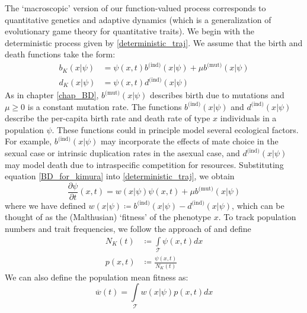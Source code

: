 The `macroscopic' version of our function-valued process corresponds to quantitative genetics and adaptive dynamics (which is a generalization of evolutionary game theory for quantitative traits). We begin with the deterministic process given by \eqref{deterministic_traj}. We assume that the birth and death functions take the form:
\begin{equation}
\label{BD_for_kimura}
\begin{aligned}
b_K(x|\psi) &=  \psi(x,t)b^{\textrm{(ind)}}(x|\psi) + \mu b^{\textrm{(mut)}}(x|\psi)\\
d_K(x|\psi) &= \psi(x,t)d^{\textrm{(ind)}}(x|\psi)
\end{aligned}
\end{equation}
As in chapter \ref{chap_BD}, $ b^{\textrm{(mut)}}(x|\psi)$ describes birth due to mutations and $\mu \geq 0$ is a constant mutation rate. The functions $b^{\textrm{(ind)}}(x|\psi)$ and $d^{\textrm{(ind)}}(x|\psi)$ describe the per-capita birth rate and death rate of type $x$ individuals in a population $\psi$. These functions could in principle model several ecological factors. For example,  $b^{\textrm{(ind)}}(x|\psi)$ may incorporate the effects of mate choice in the sexual case or intrinsic duplication rates in the asexual case, and $d^{\textrm{(ind)}}(x|\psi)$ may model death due to intraspecific competition for resources. Substituting equation \eqref{BD_for_kimura} into \eqref{deterministic_traj}, we obtain
\begin{equation}
\label{PDE_for_kimura}
\frac{\partial \psi}{\partial t}(x,t) = w(x|\psi)\psi(x,t) + \mu b^{\textrm{(mut)}}(x|\psi)
\end{equation}
where we have defined $w(x|\psi) \coloneqq b^{\textrm{(ind)}}(x|\psi) - d^{\textrm{(ind)}}(x|\psi)$, which can be thought of as the (Malthusian) `fitness' of the phenotype $x$. To track population numbers and trait frequencies, we follow the approach of \citep{week_white_2021} and define
\begin{equation}
\label{pop_size_and_freq_for_kimura}
\begin{aligned}
N_K(t) &\coloneqq \int\limits_{\mathcal{T}}\psi(x,t)dx\\
p(x,t) &\coloneqq \frac{\psi(x,t)}{N_K(t)}
\end{aligned}
\end{equation}
We can also define the population mean fitness as:
\begin{equation}
\label{mean_fitness_for_kimura}
\overline{w}(t) = \int\limits_{\mathcal{T}}w(x|\psi)p(x,t)dx
\end{equation}
